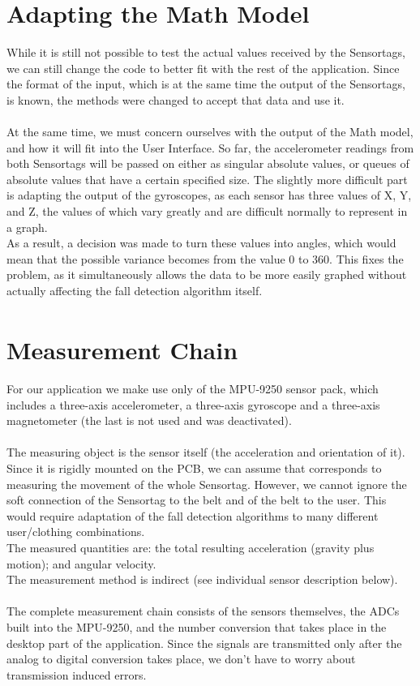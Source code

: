 \documentclass[12pt]{article}
\begin{document}
\section{Adapting the Math Model}
While it is still not possible to test the actual values received by the Sensortags, we can still change the code to better fit with the rest of the application. Since the format of the input, which is at the same time the output of the Sensortags, is known, the methods were changed to accept that data and use it.\\\\
At the same time, we must concern ourselves with the output of the Math model, and how it will fit into the User Interface. So far, the accelerometer readings from both Sensortags will be passed on either as singular absolute values, or queues of absolute values that have a certain specified size. The slightly more difficult part is adapting the output of the gyroscopes, as each sensor has three values of X, Y, and Z, the values of which vary greatly and are difficult normally to represent in a graph.\\
As a result, a decision was made to turn these values into angles, which would mean that the possible variance becomes from the value 0 to 360. This fixes the problem, as it simultaneously allows the data to be more easily graphed without actually affecting the fall detection algorithm itself. 

\section{Measurement Chain\textsuperscript{\cite{prodspec}}}
For our application we make use only of the MPU-9250 sensor pack, which includes a three-axis accelerometer, a three-axis gyroscope and a three-axis magnetometer (the last is not used and was deactivated).\\\\
The measuring object is the sensor itself (the acceleration and orientation of it). Since it is rigidly mounted on the PCB, we can assume that corresponds to measuring the movement of the whole Sensortag. However, we cannot ignore the soft connection of the Sensortag to the belt and of the belt to the user. This would require adaptation of the fall detection algorithms to many different user/clothing combinations.\\
The measured quantities are: the total resulting acceleration (gravity plus motion); and angular velocity.\\
The measurement method is indirect (see individual sensor description below).\\\\
The complete measurement chain consists of the sensors themselves, the ADCs built into the MPU-9250, and the number conversion that takes place in the desktop part of the application. Since the signals are transmitted only after the analog to digital conversion takes place, we don’t have to worry about transmission induced errors.
\end{document}
